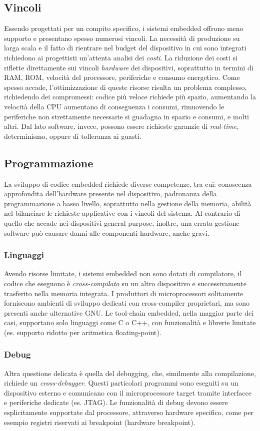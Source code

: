 \documentclass[target=bach,aauheader=,style=]{thud}
\begin{document}
    	\subsection{Vincoli}
    	Essendo progettati per un compito specifico, i sistemi embedded offrono meno supporto e presentano spesso numerosi vincoli. La necessità di produzione su larga scala e il fatto di rientrare nel budget del dispositivo in cui sono integrati richiedono ai progettisti un'attenta analisi dei \textit{costi}. La riduzione dei costi si riflette direttamente sui vincoli \textit{hardware} dei dispositivi, soprattutto in termini di RAM, ROM, velocità del processore, periferiche e consumo energetico. Come spesso accade, l'ottimizzazione di queste risorse risulta un problema complesso, richiedendo dei compromessi: codice più veloce richiede più spazio, aumentando la velocità della CPU aumentano di conseguenza i consumi, rimuovendo le periferiche non strettamente necessarie si guadagna in spazio e consumi, e molti altri.
    	Dal lato software, invece, possono essere richieste garanzie di \textit{real-time}, determinismo, oppure di tolleranza ai guasti.\cite{embeddedsys}
    	\subsection{Programmazione}
    	La sviluppo di codice embedded richiede diverse competenze, tra cui: conoscenza approfondita dell'hardware presente nel dispositivo, padronanza della programmazione a basso livello, soprattutto nella gestione della memoria, abilità nel bilanciare le richieste applicative con i vincoli del sistema.
    	Al contrario di quello che accade nei dispositivi general-purpose, inoltre, una errata gestione software può causare danni alle componenti hardware, anche gravi.
    		\subsubsection{Linguaggi}
    		Avendo risorse limitate, i sistemi embedded non sono dotati di compilatore, il codice che eseguono è \textit{cross-compilato} su un altro dispositivo e successivamente trasferito nella memoria integrata. I produttori di microprocessori solitamente forniscono ambienti di sviluppo dedicati con cross-compiler proprietari, ma sono presenti anche alternative GNU.
    		Le tool-chain embedded, nella maggior parte dei casi, supportano solo linguaggi come C o C++, con funzionalità e librerie limitate (es. supporto ridotto per aritmetica floating-point).
			\subsubsection{Debug}
			Altra questione delicata è quella del debugging, che, similmente alla compilazione, richiede un \textit{cross-debugger}. Questi particolari programmi sono eseguiti su un dispositivo esterno e comunicano con il microprocessore target tramite interfacce e periferiche dedicate (es. JTAG).
			Le funzionalità di debug devono essere esplicitamente supportate dal processore, attraverso hardware specifico, come per esempio registri riservati ai breakpoint (hardware breakpoint).
			
\end{document}

